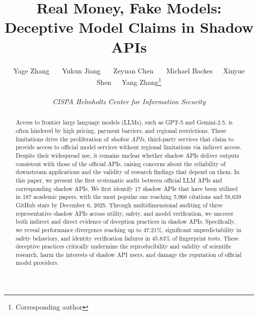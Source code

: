 \documentclass[letterpaper,twocolumn,10pt]{article}
\begin{document}

\date{}

\title{Real Money, Fake Models: Deceptive Model Claims in Shadow APIs}

\author{
Yage Zhang \ \ \
Yukun Jiang \ \ \
Zeyuan Chen \ \ \
Michael Backes\ \ \
Xinyue Shen\ \ \
Yang Zhang\thanks{Corresponding author}
\\
\\
\textit{CISPA Helmholtz Center for Information Security} 
}

\maketitle

\begin{abstract}
Access to frontier large language models (LLMs), such as GPT-5 and Gemini-2.5, is often hindered by high pricing, payment barriers, and regional restrictions.
These limitations drive the proliferation of \textit{shadow APIs}, third-party services that claim to provide access to official model services without regional limitations via indirect access.
Despite their widespread use, it remains unclear whether shadow APIs deliver outputs consistent with those of the official APIs, raising concerns about the reliability of downstream applications and the validity of research findings that depend on them.
In this paper, we present the first systematic audit between official LLM APIs and corresponding shadow APIs.
We first identify 17 shadow APIs that have been utilized in 187 academic papers, with the most popular one reaching 5,966 citations and 58,639 GitHub stars by December 6, 2025.
Through multidimensional auditing of three representative shadow APIs across utility, safety, and model verification, we uncover both indirect and direct evidence of deception practices in shadow APIs.
Specifically, we reveal performance divergence reaching up to $47.21\%$, significant unpredictability in safety behaviors, and identity verification failures in $45.83\%$ of fingerprint tests.
These deceptive practices critically undermine the reproducibility and validity of scientific research, harm the interests of shadow API users, and damage the reputation of official model providers.
\end{abstract}
\end{document}
